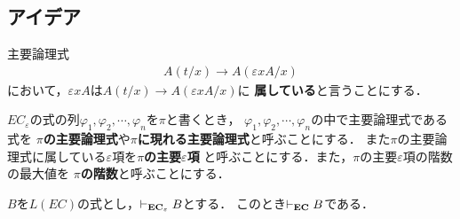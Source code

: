 \subsection{アイデア}
	
	主要論理式
	\begin{align}
		A(t/x) \rightarrow A(\varepsilon x A / x)
	\end{align}
	において，$\varepsilon x A$は$A(t/x) \rightarrow A(\varepsilon x A / x)$に
	{\bf 属している}と言うことにする．
	
	$EC_{\varepsilon}$の式の列$\varphi_{1},\varphi_{2},\cdots,\varphi_{n}$を$\pi$と書くとき，
	$\varphi_{1},\varphi_{2},\cdots,\varphi_{n}$の中で主要論理式である式を
	{\bf $\pi$の主要論理式}や{\bf $\pi$に現れる主要論理式}と呼ぶことにする．
	また$\pi$の主要論理式に属している$\varepsilon$項を{\bf $\pi$の主要$\varepsilon$項}
	と呼ぶことにする．また，$\pi$の主要$\varepsilon$項の階数の最大値を
	{\bf $\pi$の階数}と呼ぶことにする．
	
	\begin{screen}
		\begin{metathm}[第一イプシロン定理]
			$B$を$L(EC)$の式とし，$\vdash_{{\scriptsize \mbox{{\bf EC}${}_{\varepsilon}$}}} B$とする．
			このとき$\vdash_{{\scriptsize \mbox{{\bf EC}}}} B$である．
		\end{metathm}
	\end{screen}
	
